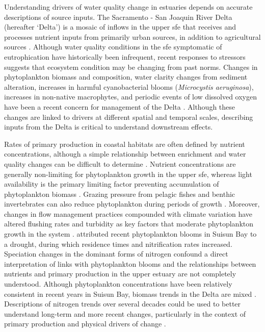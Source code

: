 \documentclass[letterpaper,12pt,oneside]{article}\usepackage[]{graphicx}\usepackage[]{color}
\begin{document}
Understanding drivers of water quality change in estuaries depends on accurate descriptions of source inputs. The Sacramento - San Joaquin River Delta (hereafter `Delta') is a mosaic of inflows in the upper \ac{sfe} that receives and processes nutrient inputs from primarily urban sources, in addition to agricultural sources \citep{Jassby00,Jassby02,Jassby08}.  Although water quality conditions in the \ac{sfe} symptomatic of eutrophication have historically been infrequent, recent responses to stressors suggests that ecosystem condition may be changing from past norms. Changes in phytoplankton biomass and composition, water clarity changes from sediment alteration, increases in harmful cyanobacterial blooms (\textit{Microcystis aeruginosa}), increases in non-native macrophytes, and periodic events of low dissolved oxygen have been a recent concern for management of the Delta \citep{Lehman05,Santos09,Hestir13,Lehman15,Dahm16,ASC17}. Although these changes are linked to drivers at different spatial and temporal scales, describing inputs from the Delta is critical to understand downstream effects.

Rates of primary production in coastal habitats are often defined by nutrient concentrations, although a simple relationship between enrichment and water quality changes can be difficult to determine \citep{Cloern01}. Nutrient concentrations are generally non-limiting for phytoplankton growth in the upper \ac{sfe}, whereas light availability is the primary limiting factor preventing accumulation of phytoplankton biomass \citep{Cole84,Alpine88}. Grazing pressure from pelagic fishes and benthic invertebrates can also reduce phytoplankton during periods of growth \citep{Nichols85,Jassby08,Kimmerer14}.  Moreover, changes in flow management practices compounded with climate variation have altered flushing rates and turbidity as key factors that moderate phytoplankton growth in the system \citep{Alpine92,Lehman00,Wright04,Canuel09}.  \citet{Glibert14} attributed recent phytoplankton blooms in Suisun Bay to a drought, during which residence times and nitrification rates increased.  Speciation changes in the dominant forms of nitrogen confound a direct interpretation of links with phytoplankton blooms and the relationships between nutrients and primary production in the upper estuary are not completely understood. Although phytoplankton concentrations have been relatively consistent in recent years in Suisun Bay, biomass trends in the Delta are mixed \citep{Jassby08,ASC17}. Descriptions of nitrogen trends over several decades could be used to better understand long-term and more recent changes, particularly in the context of primary production and physical drivers of change \citep{Dahm16}.
\end{document}
